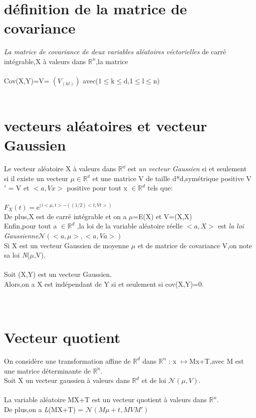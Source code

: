 \documentclass{book}
\begin{document}
		\section{définition de la matrice de covariance} \emph{La matrice de covariance de deux variables aléatoires véctorielles} de carré intégrable,X à valeurs dans $\mathbb{R}^n$,la matrice\\\\Cov(X,Y)=V= $(V_(kl))$ avec(1$\leq$k$\leq$d,1$\leq$l$\leq$n)\\\\\section{vecteurs aléatoires et vecteur Gaussien}Le vecteur aléatoire X à valeurs dans $\mathbb{R^d}$ est \emph{un vecteur Gaussien} si et seulement si il existe un vecteur $\mu \in \mathbb{R^d}$ et une matrice V de taille d*d,symétrique positive V$\prime$ = V et $<a,Vx>$ positive pour tout x $\in \mathbb{R}^d$  tels que:\\\\$F_X(t)=\mathrm{e}^{(i<\mu,t> - ((1/2)<t,Vt>)}$\\De plus,X est de carré intégrable et on a $\mu$=E(X) et V=(X,X)\\Enfin,pour tout a $\in \mathbb{R}^d$ ,la loi de la variable aléatoire réelle $<a,X>$ est \emph{la loi Gaussienne}$\mathcal{N}(<a,\mu>,<a,Va>)$\\Si X est un vecteur Gaussien de moyenne $\mu$ et de matrice de covariance V,on note sa loi \emph{N}($\mu$,V).\\\\Soit (X,Y) est un vecteur Gaussien.\\Alors,on a X est indépendant de Y si et seulement si cov(X,Y)=0.\\\\\
		\section{Vecteur quotient}
		On considère une transformation affine de $\mathbb{R}^d$ dans $\mathbb{R}^n$ : x $\mapsto$Mx+T,avec M est une matrice déterminante de $\mathbb{R}^n$.\\Soit X un vecteur gaussien à valeurs dans $\mathbb{R}^d$ et de loi $\mathcal{N}(\mu,V)$.\\\\La variable aléatoire MX+T est un vecteur quotient à valeurs dans $\mathbb{R}^n$.\\De plus,on a \emph{L}(MX+T) = $\mathcal{N}(M\mu+t,MVM\prime)$
		
\end{document}
